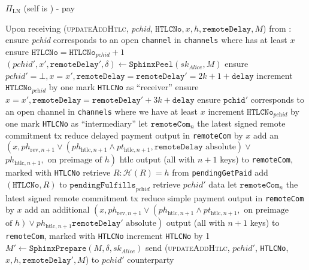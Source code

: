 \begin{protocolbox}{$\Pi_{\mathrm{LN}}$ (self is \alice) - pay}
\begin{algorithmic}[1]
    \State Upon receiving (\textsc{updateAddHtlc}, \textit{pchid},
    $\mathtt{HTLCNo}, x, h, \mathtt{remoteDelay}, M$) from \bob:
    \Indent
      \State ensure \textit{pchid} corresponds to an open \texttt{channel} in
      \texttt{channels} where \bob{} has at least $x$
      \State ensure $\mathtt{HTLCNo} = \mathtt{HTLCNo}_{\mathit{pchid}} + 1$
      \State $\left(\mathit{pchid}', x', \mathtt{remoteDelay}', \delta\right)
      \gets
      \mathtt{SphinxPeel}\left(sk_{\textit{Alice}}, M\right)$
        \State ensure $\mathit{pchid}' = \bot, x = x', \mathtt{remoteDelay} =
        \mathtt{remoteDelay}' = 2k + 1 + \mathtt{delay}$
        \State increment $\mathtt{HTLCNo}_{\textit{pchid}}$ by one
        \State mark \texttt{HTLCNo} as ``receiver''
      \Else {}
        \State ensure $x = x', \mathtt{remoteDelay} = \mathtt{remoteDelay}' + 3k
        + \mathtt{delay}$
        \State ensure $\mathtt{pchid}'$ corresponds to an open channel in
        \texttt{channels} where we have at least $x$
        \State increment $\mathtt{HTLCNo}_{\textit{pchid}}$ by one
        \State mark \texttt{HTLCNo} as ``intermediary''
      \EndIf
      \State let $\mathtt{remoteCom}_n$ the latest signed remote commitment tx
      \State reduce delayed payment output in \texttt{remoteCom} by $x$
      \State add an $\left(x, ph_{\mathrm{rev}, n+1} \vee
      \left(ph_{\mathrm{htlc}, n+1} \wedge pt_{\mathrm{htlc}, n+1},
      \mathtt{remoteDelay} \text{ absolute}\right) \vee\right.$
      $\left.ph_{\mathrm{htlc}, n+1}, \text{ on preimage of } h\right)$ htlc
      output (all with $n+1$ keys) to \texttt{remoteCom}, marked with
      \texttt{HTLCNo}
        \State retrieve $R : \mathcal{H}\left(R\right) = h$ from
        \texttt{pendingGetPaid}
        \State add $\left(\mathtt{HTLCNo}, R\right)$ to
        $\mathtt{pendingFulfills}_{\textit{pchid}}$
       
        \State retrieve $\mathit{pchid}'$ data
        \State let $\mathtt{remoteCom}_n$ the latest signed remote commitment tx
        \State reduce simple payment output in \texttt{remoteCom} by $x$
        \State add an additional $\left(x, ph_{\mathrm{rev}, n+1} \vee
        \left(ph_{\mathrm{htlc}, n+1} \wedge pt_{\mathrm{htlc}, n+1}, \text{ on
        preimage}\right.\right.$ $\left.\left.\text{of } h\right) \vee
        ph_{\mathrm{htlc}, n+1}\mathtt{remoteDelay}' \text{ absolute}\right)$
        output (all with $n+1$ keys) to \texttt{remoteCom}, marked with
        \texttt{HTLCNo}
        \State increment \texttt{HTLCNo} by 1
        \State $M' \gets \mathtt{SphinxPrepare}\left(M, \delta,
        sk_{\mathit{Alice}}\right)$
        \State send (\textsc{updateAddHtlc}, $\mathit{pchid}'$, \texttt{HTLCNo},
        $x, h, \mathtt{remoteDelay}', M$) to $\mathit{pchid}'$ counterparty
      \EndIf
    \EndIndent
    \State


\end{algorithmic}
\end{protocolbox}
